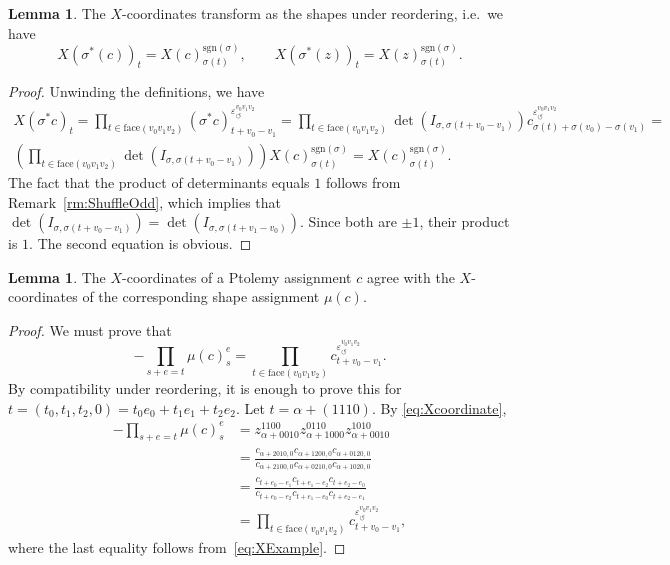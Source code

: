 \documentclass[12pt]{amsart}
\theoremstyle{definition}
\newtheorem{lemma}[theorem]{Lemma}
\numberwithin{equation}{section}
\def\sgn{\mathrm{sgn}}
\begin{document}
\begin{lemma} The $X$-coordinates transform as the shapes under reordering, i.e.~we have
\begin{equation}
X(\sigma^*(c))_t=X(c)^{\sgn(\sigma)}_{\sigma(t)},\qquad X(\sigma^*(z))_t=X(z)^{\sgn(\sigma)}_{\sigma(t)}.
\end{equation}
\end{lemma}
\begin{proof}
Unwinding the definitions, we have
\begin{multline}
X(\sigma^*c)_t=
\prod_{t\in \mathrm{face}(v_0v_1v_2)}(\sigma^* c)^{\varepsilon_\circlearrowleft^{v_0v_1v_2}}_{t+v_0-v_1} =
\prod_{t\in\mathrm{face}(v_0v_1v_2)} \det(I_{\sigma,\sigma(t+v_0-v_1)}) c^{\varepsilon_\circlearrowleft^{v_0v_1v_2}}_{\sigma(t)+\sigma(v_0)-\sigma(v_1)}=\\
\left(\prod_{t\in \mathrm{face}(v_0v_1v_2)} \det(I_{\sigma,\sigma(t+v_0-v_1)})\right) X(c)_{\sigma(t)}^{\sgn(\sigma)} =
 X(c)_{\sigma(t)}^{\sgn(\sigma)}.
\end{multline}
The fact that the product of determinants equals $1$ follows from Remark~\ref{rm:ShuffleOdd}, which implies that $\det(I_{\sigma,\sigma(t+v_0-v_1)})=\det(I_{\sigma,\sigma(t+v_1-v_0)})$. Since both are $\pm 1$, their product is $1$. The second equation is obvious.
\end{proof}

\begin{lemma} The $X$-coordinates of a Ptolemy assignment $c$ agree with the $X$-coordinates of the corresponding shape assignment $\mu(c)$.
\end{lemma}
\begin{proof}
We must prove that
\begin{equation}
-\prod_{s+e=t}\mu(c)^e_s=\prod_{t\in \mathrm{face}(v_0v_1v_2)}c^{\varepsilon_\circlearrowleft^{v_0v_1v_2}}_{t+v_0-v_1}.
\end{equation}
By compatibility under reordering, it is enough to prove this for $t=(t_0,t_1,t_2,0)=t_0e_0+t_1e_1+t_2e_2$.
Let $t=\alpha+(1110)$. By \eqref{eq:Xcoordinate},
\begin{equation}
\begin{aligned}
-\prod_{s+e=t}\mu(c)^e_s&=z^{1100}_{\alpha+0010}z^{0110}_{\alpha+1000}z^{1010}_{\alpha+0010}\\
&=\frac{c_{\alpha+2010,0}c_{\alpha+1200,0}c_{\alpha+0120,0}}{c_{\alpha+2100,0} c_{\alpha+0210,0} c_{\alpha+1020,0}}\\
&=\frac{c_{t+e_0-e_1}c_{t+e_1-e_2}c_{t+e_2-e_0}}{c_{t+e_0-e_2}c_{t+e_1-e_0}c_{t+e_2-e_1}}\\
&=\prod_{t\in \mathrm{face}(v_0v_1v_2)}c^{\varepsilon_\circlearrowleft^{v_0v_1v_2}}_{t+v_0-v_1},
\end{aligned}
\end{equation}
where the last equality follows from~\eqref{eq:XExample}.
\end{proof}
\end{document}

